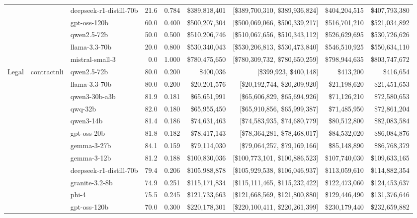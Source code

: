 \begin{table}[t]
\begin{tabular}{lllrrrrrr}
   &  & deepseek-r1-distill-70b & 21.6 & 0.784 & \$389,818,401 & [\$389,700,310, \$389,936,824] & \$404,204,515 & \$407,793,380 \\
   &  & gpt-oss-120b & 60.0 & 0.400 & \$500,207,304 & [\$500,069,066, \$500,339,217] & \$516,701,210 & \$521,034,892 \\
   &  & qwen2.5-72b & 50.0 & 0.500 & \$510,206,746 & [\$510,067,656, \$510,343,112] & \$526,629,695 & \$530,726,626 \\
   &  & llama-3.3-70b & 20.0 & 0.800 & \$530,340,043 & [\$530,206,813, \$530,473,840] & \$546,510,925 & \$550,634,110 \\
   &  & mistral-small-3 & 0.0 & 1.000 & \$780,475,650 & [\$780,309,732, \$780,650,259] & \$798,944,635 & \$803,747,672 \\
\midrule
  Legal & contractnli & qwen2.5-72b & 80.0 & 0.200 & \$400,036 & [\$399,923, \$400,148] & \$413,200 & \$416,654 \\
   &  & llama-3.3-70b & 80.0 & 0.200 & \$20,201,576 & [\$20,192,744, \$20,209,920] & \$21,198,620 & \$21,451,653 \\
   &  & qwen3-30b-a3b & 81.9 & 0.181 & \$65,651,991 & [\$65,606,829, \$65,694,926] & \$71,126,210 & \$72,580,653 \\
   &  & qwq-32b & 82.0 & 0.180 & \$65,955,450 & [\$65,910,856, \$65,999,387] & \$71,485,950 & \$72,861,204 \\
   &  & qwen3-14b & 81.4 & 0.186 & \$74,631,463 & [\$74,583,935, \$74,680,779] & \$80,512,800 & \$82,083,584 \\
   &  & gpt-oss-20b & 81.8 & 0.182 & \$78,417,143 & [\$78,364,281, \$78,468,017] & \$84,532,020 & \$86,084,876 \\
   &  & gemma-3-27b & 84.1 & 0.159 & \$79,114,030 & [\$79,064,257, \$79,169,166] & \$85,148,890 & \$86,768,379 \\
   &  & gemma-3-12b & 81.2 & 0.188 & \$100,830,036 & [\$100,773,101, \$100,886,523] & \$107,740,030 & \$109,633,165 \\
   &  & deepseek-r1-distill-70b & 79.4 & 0.206 & \$105,988,878 & [\$105,929,538, \$106,046,937] & \$113,059,610 & \$114,882,354 \\
   &  & granite-3.2-8b & 74.9 & 0.251 & \$115,171,834 & [\$115,111,465, \$115,232,422] & \$122,473,060 & \$124,453,637 \\
   &  & phi-4 & 75.5 & 0.245 & \$121,733,663 & [\$121,668,569, \$121,800,880] & \$129,446,490 & \$131,376,646 \\
   &  & gpt-oss-120b & 70.0 & 0.300 & \$220,178,301 & [\$220,100,411, \$220,261,399] & \$230,179,440 & \$232,659,882 \\

\end{tabular}
\end{table}
